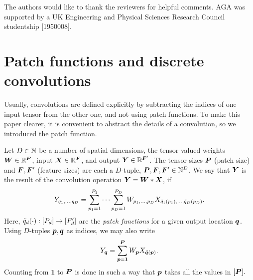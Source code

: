 \documentclass[accepted]{uai2021} %
\newcommand{\layersizebase}{\vF}
\newcommand{\patchsizebase}{\vP}
\newcommand{\patchf}[2]{{\tilde#1\bra{#2}}}
\newcommand{\patch}{\vp}               %
\newcommand{\patchs}{p}               %
\newcommand{\nextpatch}{\vq}
\newcommand{\nextpatchs}{q}
\newcommand{\0}{\boldsymbol{0}}
\newcommand{\1}{\boldsymbol{1}}
\begin{document}
\begin{acknowledgements}
The authors would like to thank the reviewers for helpful comments.
AGA was supported by a UK Engineering and Physical Sciences Research Council studentship [1950008].
\end{acknowledgements}


\balance

\cleardoublepage

\appendix %
\section{Patch functions and discrete convolutions}
Usually, convolutions are defined explicitly by subtracting the indices of one input tensor from the other one, and not using patch functions. To make this paper clearer, it is convenient to abstract the details of a convolution, so we introduced the patch function.

\begin{definition}
  \label{def:convolution}
  Let $D \in {\mathbb{N}}$ be a number of spatial dimensions, the tensor-valued weights
  $\mW\in \sR^{\patchsizebase}$, input ${\bm{X}}\in {\mathbb{R}}^{{\bm{F}}}$, and output ${\bm{Y}} \in {\mathbb{R}}^{{\bm{F}}'}$.
  The tensor sizes $\patchsizebase$ (patch size) and $\layersizebase,\layersizebase'$ (feature sizes) are each a
  $D$-tuple, $\patchsizebase,\layersizebase,\layersizebase' \in \sN^{D}$.
  We say that ${\bm{Y}}$ is the result of the convolution operation ${\bm{Y}} = {\bm{W}}*{\bm{X}}$, if
  \begin{equation}
    Y_{\nextpatchs_{1},\dots,\nextpatchs_{D}} = \sum_{\patchs_{1}=1}^{P_{1}} \dots \sum_{\patchs_{D}=1}^{P_{D}} W_{\patchs_{1},\dots,\patchs_{D}} X_{\patchf{\nextpatchs_{1}}{\patchs_{1}}, \dots, \patchf{\nextpatchs_{D}}{\patchs_{D}}}.
    \label{eq:def-convolution-no-tuples}
  \end{equation}
  Here, $\patchf{\nextpatchs_{d}}{\cdot} : \countto{P_{d}} \to \countto{F'_{d}}$ are the \emph{patch functions} for a given output location $\nextpatch$. Using $D$-tuples $\patch,\nextpatch$ as indices, we may also write
  \begin{equation}
    Y_{\nextpatch} = \sum_{\patch=\1}^{\vP} W_{\patch} X_{\patchf{\nextpatch}{\patch}}.
    \label{eq:def-convolution-tuples}
  \end{equation}
  Counting from $\1$ to $\patchsizebase$ is done in such a way that $\patch$ takes all the values in $\countto{\patchsizebase}.$
  \end{definition}
\end{document}
